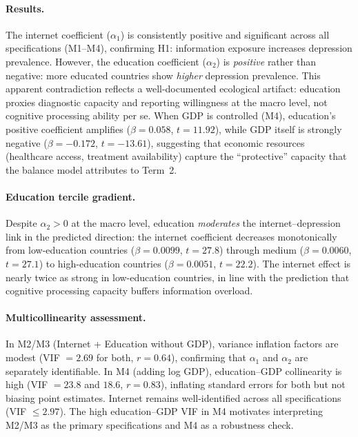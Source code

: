 \documentclass[a4paper,11pt,titlepage]{article}
\begin{document}
\paragraph{Results.} The internet coefficient ($\alpha_1$) is consistently positive and significant across all specifications (M1--M4), confirming H1: information exposure increases depression prevalence. However, the education coefficient ($\alpha_2$) is \textit{positive} rather than negative: more educated countries show \textit{higher} depression prevalence. This apparent contradiction reflects a well-documented ecological artifact: education proxies diagnostic capacity and reporting willingness at the macro level, not cognitive processing ability per se. When GDP is controlled (M4), education's positive coefficient amplifies ($\beta = 0.058$, $t = 11.92$), while GDP itself is strongly negative ($\beta = -0.172$, $t = -13.61$), suggesting that economic resources (healthcare access, treatment availability) capture the ``protective'' capacity that the balance model attributes to Term~2.

\paragraph{Education tercile gradient.} Despite $\alpha_2 > 0$ at the macro level, education \textit{moderates} the internet--depression link in the predicted direction: the internet coefficient decreases monotonically from low-education countries ($\beta = 0.0099$, $t = 27.8$) through medium ($\beta = 0.0060$, $t = 27.1$) to high-education countries ($\beta = 0.0051$, $t = 22.2$). The internet effect is nearly twice as strong in low-education countries, in line with the prediction that cognitive processing capacity buffers information overload.

\paragraph{Multicollinearity assessment.} In M2/M3 (Internet + Education without GDP), variance inflation factors are modest (VIF $= 2.69$ for both, $r = 0.64$), confirming that $\alpha_1$ and $\alpha_2$ are separately identifiable. In M4 (adding log GDP), education--GDP collinearity is high (VIF $= 23.8$ and $18.6$, $r = 0.83$), inflating standard errors for both but not biasing point estimates. Internet remains well-identified across all specifications (VIF $\leq 2.97$). The high education--GDP VIF in M4 motivates interpreting M2/M3 as the primary specifications and M4 as a robustness check.
\end{document}
